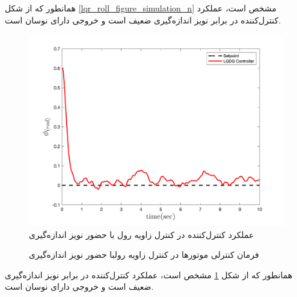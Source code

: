 همانطور که از شکل
\ref{lqr_roll_figure_simulation_n}
مشخص است، عملکرد کنترل‌کننده  در برابر نویز اندازه‌گیری ضعیف است و خروجی دارای نوسان است.



\begin{figure}[H]
	\includegraphics[width=.48\linewidth]{../Figures/MIL/LQDG/Roll/lqdg_roll.png}
	\centering
	\caption{عملكرد کنترل‌کننده   در کنترل زاويه رول با حضور نويز اندازه‌گیری}
	\label{lqdg_roll_fig_simulation_n}
\end{figure}
\begin{figure}[H]
	\centering
	\caption{‫‪فرمان کنترلی موتورها در کنترل زاویه رولبا حضور نويز اندازه‌گیری}
\end{figure}
همانطور که از شکل
\ref{lqdg_roll_fig_simulation_n}
مشخص است، عملکرد کنترل‌کننده  در برابر نویز اندازه‌گیری ضعیف است و خروجی دارای نوسان است.





